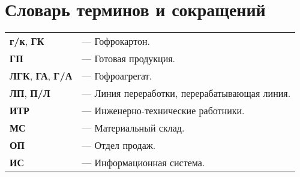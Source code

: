 
\section*{Словарь терминов и сокращений}
\noindent

\begin{tabular}{l l}
{\bf г/к}, {\bf ГК}  & --- Гофрокартон.\\
{\bf ГП}  & --- Готовая продукция.\\
{\bf ЛГК}, {\bf ГА}, {\bf Г/А}  & --- Гофроагрегат.\\
{\bf ЛП}, {\bf П/Л}  & --- Линия переработки, перерабатывающая линия.\\

{\bf ИТР}  & --- Инженерно-технические работники.\\

{\bf МС}  & --- Материальный склад.\\
{\bf ОП}  & --- Отдел продаж.\\
{\bf ИС}  & --- Информационная система.\\


\end{tabular}
